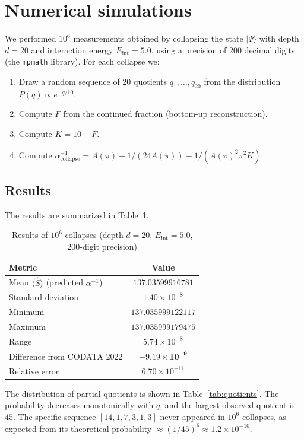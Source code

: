 \documentclass[12pt]{article}
\begin{document}
\section{Numerical simulations}

We performed $10^6$ measurements obtained by collapsing the state $|\Psi\rangle$ with depth $d=20$ and interaction energy $E_{\text{int}}=5.0$, using a precision of 200 decimal digits (the \texttt{mpmath} library). For each collapse we:

\begin{enumerate}
    \item Draw a random sequence of 20 quotients $q_1,\dots,q_{20}$ from the distribution $P(q) \propto e^{-q/10}$.
    \item Compute $F$ from the continued fraction (bottom-up reconstruction).
    \item Compute $K = 10 - F$.
    \item Compute $\alpha^{-1}_{\text{collapse}} = A(\pi) - 1/(24A(\pi)) - 1/(A(\pi)^2 \pi^2 K)$.
\end{enumerate}

\subsection{Results}

The results are summarized in Table~\ref{tab:results}.

\begin{table}[h]
\centering
\caption{Results of $10^6$ collapses (depth $d=20$, $E_{\text{int}}=5.0$, 200-digit precision)}
\label{tab:results}
\begin{tabular}{lc}
\toprule
Metric & Value \\
\midrule
Mean $\langle \hat S \rangle$ (predicted $\alpha^{-1}$) & $137.03599916781$ \\
Standard deviation & $1.40\times10^{-8}$ \\
Minimum & $137.035999122117$ \\
Maximum & $137.035999179475$ \\
Range & $5.74\times10^{-8}$ \\
Difference from CODATA 2022 & $\mathbf{-9.19\times10^{-9}}$ \\
Relative error & $6.70\times10^{-11}$ \\
\bottomrule
\end{tabular}
\end{table}

The distribution of partial quotients is shown in Table~\ref{tab:quotients}. The probability decreases monotonically with $q$, and the largest observed quotient is $45$. The specific sequence $[14,1,7,3,1,3]$ never appeared in $10^6$ collapses, as expected from its theoretical probability $\approx (1/45)^6 \approx 1.2\times10^{-10}$.
\end{document}
